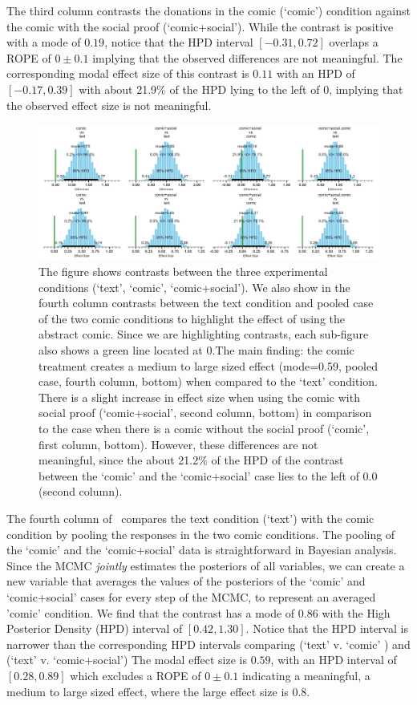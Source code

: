The third column contrasts the donations in the comic (`comic') condition against the comic with the social proof (`comic+social'). While the contrast is positive with a mode of $0.19$, notice that the HPD interval $[-0.31, 0.72]$ overlaps a ROPE of $0 \pm 0.1$ implying that the observed differences are not meaningful. The corresponding modal effect size of this contrast is $0.11$ with an HPD of $[-0.17, 0.39]$ with about 21.9\% of the HPD lying to the left of 0, implying that the observed effect size is not meaningful.


\begin{figure}[htb]
	\includegraphics[width=1\textwidth]{./hari-code/robust_contrasts.pdf}
    \caption{The figure shows contrasts between the three experimental conditions (`text', `comic', `comic+social'). We also show in the fourth column contrasts between the text condition and pooled case of the two comic conditions to highlight the effect of using the abstract comic. Since we are highlighting contrasts, each sub-figure also shows a green line located at 0.The main finding: the comic treatment creates a medium to large sized effect (mode=0.59, pooled case, fourth column, bottom) when compared to the `text' condition. There is a slight increase in effect size when using the comic with social proof (`comic+social', second column, bottom) in comparison to the case when there is a comic without the social proof (`comic', first column, bottom). However, these differences are not meaningful, since the about 21.2\% of the HPD of the contrast between the `comic' and the `comic+social' case lies to the left of 0.0 (second column). }
	\label{fig:robustcontrasts}
\end{figure}

The fourth column of~ compares the text condition (`text') with the comic condition by pooling the responses in the two comic conditions. The pooling of the `comic' and the `comic+social' data is straightforward in Bayesian analysis. Since the MCMC \textit{jointly} estimates the posteriors of all variables, we can create a new variable that averages the values of the posteriors of the `comic' and `comic+social' cases for every step of the MCMC, to represent an averaged 'comic' condition.  We find that the contrast has a mode of $0.86$ with the High Posterior Density (HPD) interval of $[0.42, 1.30]$. Notice that the HPD interval is narrower than the corresponding HPD intervals comparing (`text' v. `comic' ) and (`text' v. `comic+social') The modal effect size is $0.59$, with an HPD interval of $[0.28, 0.89]$ which excludes a ROPE of $0 \pm 0.1$ indicating a meaningful, a medium to large sized effect, where the large effect size is $0.8$. 

